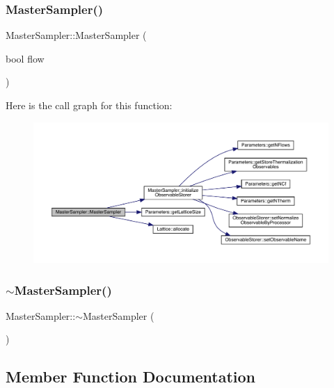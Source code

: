 \subsubsection{\texorpdfstring{MasterSampler()}{MasterSampler()}}
{\footnotesize\ttfamily Master\+Sampler\+::\+Master\+Sampler (\begin{DoxyParamCaption}\item[{bool}]{flow }\end{DoxyParamCaption})}

Here is the call graph for this function\+:\nopagebreak
\begin{figure}[H]
\begin{center}
\leavevmode
\includegraphics[width=350pt]{class_master_sampler_ac5ee503e8391aca36f73872a45bb6bd9_cgraph}
\end{center}
\end{figure}
\mbox{\label{class_master_sampler_a040e460a888f8dc066de84563f83caa6}} 
\subsubsection{\texorpdfstring{$\sim$MasterSampler()}{~MasterSampler()}}
{\footnotesize\ttfamily Master\+Sampler\+::$\sim$\+Master\+Sampler (\begin{DoxyParamCaption}{ }\end{DoxyParamCaption})}



\subsection{Member Function Documentation}
\mbox{\label{class_master_sampler_ad3cc7e36498dbf4a39238de3ac59ae8b}} 

